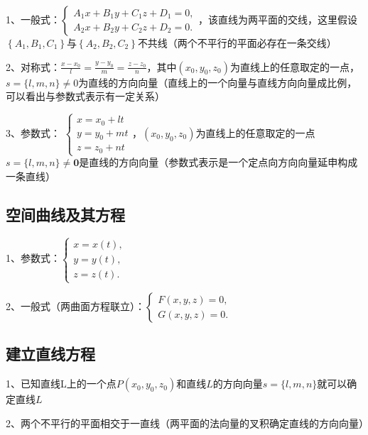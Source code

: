 1、一般式：$\left\{\begin{array}{l}A_{1} x+B_{1} y+C_{1} z+D_{1}=0, \\ A_{2} x+B_{2} y+C_{2} z+D_{2}=0 .\end{array}\right.$，该直线为两平面的交线，这里假设$\left\{A_{1}, B_{1},C_{1}\right\}$与$\left\{A_{2}, B_{2}, C_{2}\right\}$不共线（两个不平行的平面必存在一条交线）

2、对称式：$\frac{x-x_{0}}{l}=\frac{y-y_{0}}{m}=\frac{z-z_{0}}{n}$，其中$\left(x_{0}, y_{0}, z_{0}\right)$为直线上的任意取定的一点，$s=\{l, m, n\} \neq 0$为直线的方向向量（直线上的一个向量与直线方向向量成比例，可以看出与参数式表示有一定关系）

3、参数式： $\left\{\begin{array}{l}x=x_{0}+l t \\ y=y_{0}+m t \\ z=z_{0}+n t \end{array}\right.$，$\left(x_{0}, y_{0}, z_{0}\right)$为直线上的任意取定的一点$s=\{l, m, n\} \neq \mathbf{0}$是直线的方向向量（参数式表示是一个定点向方向向量延申构成一条直线）



\subsection{空间曲线及其方程}

1、参数式：$\left\{\begin{array}{l}x=x(t), \\ y=y(t), \\ z=z(t) .\end{array}\right.$

2、一般式（两曲面方程联立）：$\left\{\begin{array}{l}F(x, y, z)=0, \\ G(x, y, z)=0 .\end{array}\right.$



\subsection{建立直线方程}

1、已知直线L上的一个点$P\left(x_{0}, y_{0}, z_{0}\right)$和直线$L$的方向向量$s=\{l, m, n\}$就可以确定直线$L$

2、两个不平行的平面相交于一直线（两平面的法向量的叉积确定直线的方向向量）



